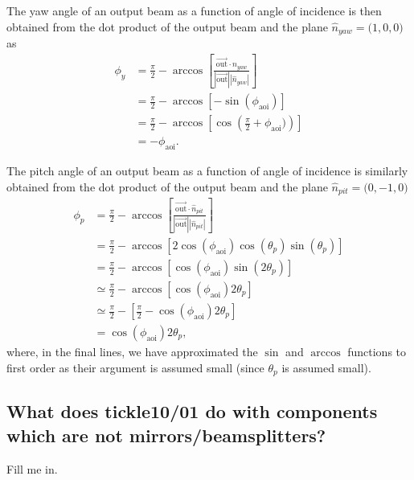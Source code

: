 \documentclass[12pt]{article}
\newcommand{\threeVec}[3]{\big( {#1}, {#2}, {#3} \big)}
\newcommand{\myVec}[1]{\vec{#1}}
\begin{document}
The yaw angle of an output beam as a function of angle of incidence is
then obtained from the dot product of the output beam and the plane
$\hat{n}_{yaw}=\threeVec{1}{0}{0}$ as
\begin{align}
  \phi_y &= \frac{\pi}{2} - \arccos\left[\frac{\myVec{\mathrm{out}}\cdot\hat{n}_{yaw}}{|\myVec{\mathrm{out}}||\hat{n}_{yaw}|}\right]\\
  &=\frac{\pi}{2} - \arccos\left[ -\sin(\phi_\mathrm{aoi}) \right]\\
  &=\frac{\pi}{2} - \arccos\left[ \cos\left(\frac{\pi}{2}+\phi_\mathrm{aoi})\right) \right]\\
&=-\phi_\mathrm{aoi}.
\end{align}

The pitch angle of an output beam as a function of angle of incidence
is similarly obtained from the dot product of the output beam and the plane
$\hat{n}_{pit}=\threeVec{0}{-1}{0}$
\begin{align}
  \phi_p &= \frac{\pi}{2} - \arccos\left[\frac{\myVec{\mathrm{out}}\cdot\hat{n}_{pit}}{|\myVec{\mathrm{out}}||\hat{n}_{pit}|}\right]\\
  &=\frac{\pi}{2} - \arccos\left[2\cos(\phi_\mathrm{aoi})\cos(\theta_p)\sin(\theta_p)\right]\\
&=\frac{\pi}{2} - \arccos\left[\cos(\phi_\mathrm{aoi})\sin(2\theta_p)\right]\\
&\simeq \frac{\pi}{2} - \arccos\left[\cos(\phi_\mathrm{aoi})2\theta_p\right]\\
&\simeq \frac{\pi}{2} - \left[\frac{\pi}{2}-\cos(\phi_\mathrm{aoi})2\theta_p\right]\\
&=\cos(\phi_\mathrm{aoi})2\theta_p,
\end{align}
where, in the final lines, we have approximated the $\sin$ and $\arccos$
functions to first order as their argument is assumed small (since
$\theta_p$ is assumed small).

\subsection{What does tickle10/01 do with components which are not mirrors/beamsplitters?}

Fill me in.
\end{document}
